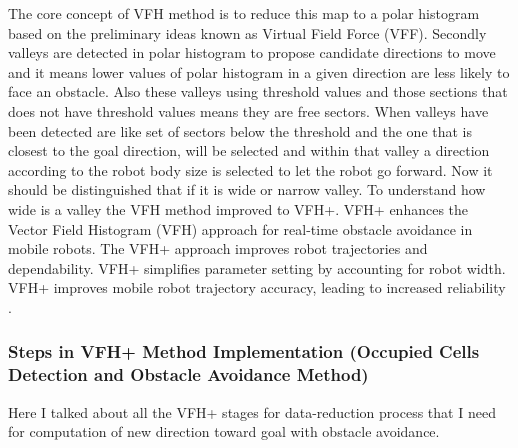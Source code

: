  \noindent The core concept of VFH method is to reduce this map to a polar histogram based on the preliminary ideas known as Virtual Field Force (VFF). Secondly valleys are detected in polar histogram to propose candidate directions to move and it means lower values of polar histogram in a given direction are less likely to face an obstacle. Also these valleys using threshold values and those sections that does not have threshold values means they are free sectors. When valleys have been detected are like set of sectors below the threshold and the one that is closest to the goal direction, will be selected and within that valley a direction according to the robot body size is selected to let the robot go forward. Now it should be distinguished that if it is wide or narrow valley\cite{VFH}. To understand how wide is a valley the VFH method improved to VFH+. VFH+ enhances the Vector Field Histogram (VFH) approach for real-time obstacle avoidance in mobile robots. The VFH+ approach improves robot trajectories and dependability. VFH+ simplifies parameter setting by accounting for robot width. VFH+ improves mobile robot trajectory accuracy, leading to increased reliability \cite{ulrich1998vfh+}. \\

   
 


\subsubsection{ Steps in VFH+ Method Implementation (Occupied Cells Detection and Obstacle Avoidance Method) }

Here I talked about all the VFH+ stages for data-reduction process that I need for computation of new direction toward goal with obstacle avoidance. \\

